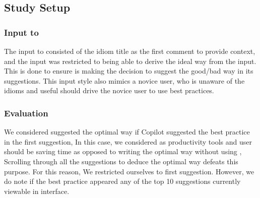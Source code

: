 \subsection{Study Setup}

\subsubsection{Input to \cop{}}
\label{input}
The input to \cop{} consisted of the idiom title as the first comment to provide context, and the input was restricted to being able to derive the ideal way from the input. This is done to ensure \cop{} is making the decision to suggest the good/bad way in its suggestions. This input style also mimics a novice user, who is unaware of the idioms and useful \cct{} should drive the novice user to use best practices.

\subsubsection{Evaluation}
\label{evaluation}
We considered \cop{} suggested the optimal way if Copilot suggested the best practice in the first suggestion, In this case, we considered \cct{} as productivity tools and user should be saving time as opposed to writing the optimal way without using \cct{}, Scrolling through all the suggestions to deduce the optimal way defeats this purpose. For this reason, We restricted ourselves to first suggestion. However, we do note if the best practice appeared any of the top 10 suggestions currently viewable in \cop{} interface. 




